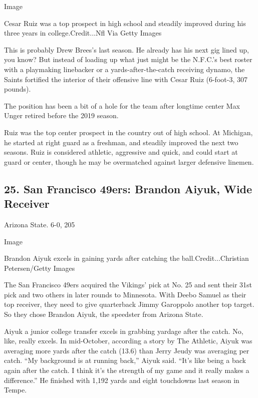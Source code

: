 Image

Cesar Ruiz was a top prospect in high school and steadily improved
during his three years in college.Credit...Nfl Via Getty Images

This is probably Drew Brees's last season. He already has his next gig
lined up, you know? But instead of loading up what just might be the
N.F.C.'s best roster with a playmaking linebacker or a
yards-after-the-catch receiving dynamo, the Saints fortified the
interior of their offensive line with Cesar Ruiz (6-foot-3, 307 pounds).

The position has been a bit of a hole for the team after longtime center
Max Unger retired before the 2019 season.

Ruiz was the top center prospect in the country out of high school. At
Michigan, he started at right guard as a freshman, and steadily improved
the next two seasons. Ruiz is considered athletic, aggressive and quick,
and could start at guard or center, though he may be overmatched against
larger defensive linemen.

\hypertarget{25-san-francisco-49ers-brandon-aiyuk-wide-receiver}{%
\subsection{25. San Francisco 49ers: Brandon Aiyuk, Wide
Receiver}\label{25-san-francisco-49ers-brandon-aiyuk-wide-receiver}}

Arizona State. 6-0, 205

Image

Brandon Aiyuk excels in gaining yards after catching the
ball.Credit...Christian Petersen/Getty Images

The San Francisco 49ers acquired the Vikings' pick at No. 25 and sent
their 31st pick and two others in later rounds to Minnesota. With Deebo
Samuel as their top receiver, they need to give quarterback Jimmy
Garoppolo another top target. So they chose Brandon Aiyuk, the speedster
from Arizona State.

Aiyuk a junior college transfer excels in grabbing yardage after the
catch. No, like, really excels. In mid-October, according a story by The
Athletic, Aiyuk was averaging more yards after the catch (13.6) than
Jerry Jeudy was averaging per catch. ``My background is at running
back,'' Aiyuk said. ``It's like being a back again after the catch. I
think it's the strength of my game and it really makes a difference.''
He finished with 1,192 yards and eight touchdowns last season in Tempe.


